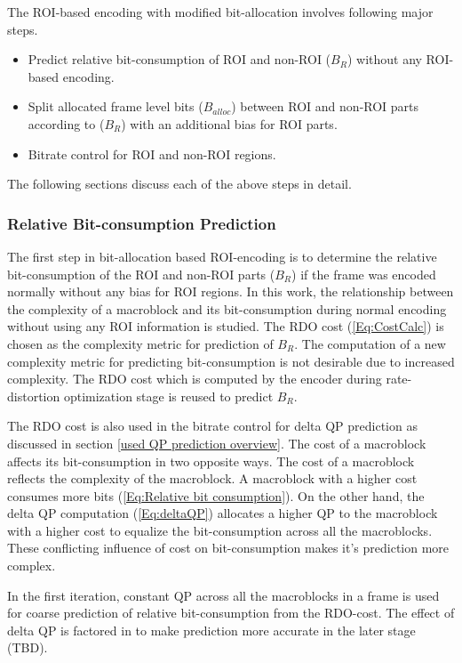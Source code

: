 \documentclass[11pt]{article} %
\begin{document}
The ROI-based encoding with modified bit-allocation involves following major steps.
\begin{itemize}
	\item Predict relative bit-consumption of ROI and non-ROI ($B_R$) without any ROI-based encoding.
	\item Split allocated frame level bits ($B_{alloc}$) between ROI and non-ROI parts according to ($B_R$) with an additional bias for ROI parts.
	\item Bitrate control for ROI and non-ROI regions.
\end{itemize}
The following sections discuss each of the above steps in detail.

\subsubsection{Relative Bit-consumption Prediction} \label{sec:Relative Bit-consumption Prediction}
The first step in bit-allocation based ROI-encoding is to determine the relative bit-consumption of the ROI and non-ROI parts ($B_R$) if the frame was encoded normally without any bias for ROI regions. In this work, the relationship between the complexity of a macroblock and its bit-consumption during normal encoding without using any ROI information is studied. The RDO cost (\ref{Eq:CostCalc}) is chosen as the complexity metric for prediction of $B_R$. The computation of a new complexity metric for predicting bit-consumption is not desirable due to increased complexity. The RDO cost which is computed by the encoder during rate-distortion optimization stage is reused to predict $B_R$. 

The RDO cost is also used in the bitrate control for delta QP prediction as discussed in section \ref{used QP prediction overview}. The cost of a macroblock affects its bit-consumption in two opposite ways. The cost of a macroblock reflects the complexity of the macroblock. A macroblock with a higher cost consumes more bits (\ref{Eq:Relative bit consumption}). On the other hand, the delta QP computation (\ref{Eq:deltaQP}) allocates a higher QP to the macroblock with a higher cost to equalize the bit-consumption across all the macroblocks. These conflicting influence of cost on bit-consumption makes it's prediction more complex. 

In the first iteration, constant QP across all the macroblocks in a frame is used for coarse prediction of relative bit-consumption from the RDO-cost. The effect of delta QP is factored in to make prediction more accurate in the later stage (TBD).
\end{document}
